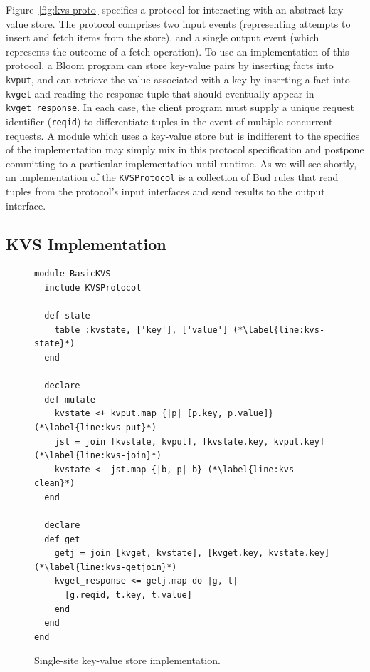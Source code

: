 Figure~\ref{fig:kvs-proto} specifies a protocol for interacting with an abstract
key-value store. The protocol comprises two input events (representing attempts
to insert and fetch items from the store), and a single output event (which
represents the outcome of a fetch operation). To use an implementation of this
protocol, a Bloom program can store key-value pairs by inserting facts into
\texttt{kvput}, and can retrieve the value associated with a key by inserting a
fact into \texttt{kvget} and reading the response tuple that should eventually
appear in \texttt{kvget\_response}. In each case, the client program must supply
a unique request identifier (\texttt{reqid}) to differentiate tuples in the
event of multiple concurrent requests.  A module which uses a key-value store
but is indifferent to the specifics of the implementation may simply mix in this
protocol specification and postpone committing to a particular implementation
until runtime. As we will see shortly, an implementation of the
\texttt{KVSProtocol} is a collection of Bud rules that read tuples from the
protocol's input interfaces and send results to the output interface.

\subsection{KVS Implementation}
\begin{figure}[t]
\begin{scriptsize}
\begin{lstlisting}
module BasicKVS
  include KVSProtocol

  def state
    table :kvstate, ['key'], ['value'] (*\label{line:kvs-state}*)
  end

  declare
  def mutate
    kvstate <+ kvput.map {|p| [p.key, p.value]} (*\label{line:kvs-put}*)
    jst = join [kvstate, kvput], [kvstate.key, kvput.key] (*\label{line:kvs-join}*)
    kvstate <- jst.map {|b, p| b} (*\label{line:kvs-clean}*)
  end

  declare
  def get
    getj = join [kvget, kvstate], [kvget.key, kvstate.key] (*\label{line:kvs-getjoin}*)
    kvget_response <= getj.map do |g, t|
      [g.reqid, t.key, t.value]
    end
  end
end
\end{lstlisting}
\centering
\vspace{-10pt}
\caption{Single-site key-value store implementation.}
\label{fig:kvs-impl}
\end{scriptsize}
\vspace{-2pt}
\end{figure}

